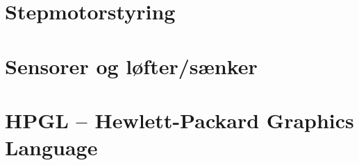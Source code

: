 

\section{Stepmotorstyring}



\section{Sensorer og løfter/sænker}


\section{HPGL -- Hewlett-Packard Graphics Language}



